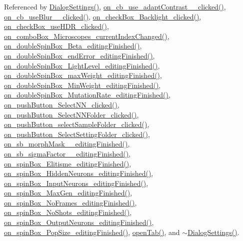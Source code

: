 Referenced by \hyperlink{dialogsettings_8cpp_source_l00005}{Dialog\+Settings()}, \hyperlink{dialogsettings_8cpp_source_l00370}{on\+\_\+cb\+\_\+use\+\_\+adapt\+Contrast\+\_\+\_\+clicked()}, \hyperlink{dialogsettings_8cpp_source_l00376}{on\+\_\+cb\+\_\+use\+Blur\+\_\+\_\+clicked()}, \hyperlink{dialogsettings_8cpp_source_l00222}{on\+\_\+check\+Box\+\_\+\+Backlight\+\_\+clicked()}, \hyperlink{dialogsettings_8cpp_source_l00256}{on\+\_\+check\+Box\+\_\+use\+H\+D\+R\+\_\+clicked()}, \hyperlink{dialogsettings_8cpp_source_l00227}{on\+\_\+combo\+Box\+\_\+\+Microscopes\+\_\+current\+Index\+Changed()}, \hyperlink{dialogsettings_8cpp_source_l00449}{on\+\_\+double\+Spin\+Box\+\_\+\+Beta\+\_\+editing\+Finished()}, \hyperlink{dialogsettings_8cpp_source_l00437}{on\+\_\+double\+Spin\+Box\+\_\+end\+Error\+\_\+editing\+Finished()}, \hyperlink{dialogsettings_8cpp_source_l00290}{on\+\_\+double\+Spin\+Box\+\_\+\+Light\+Level\+\_\+editing\+Finished()}, \hyperlink{dialogsettings_8cpp_source_l00441}{on\+\_\+double\+Spin\+Box\+\_\+max\+Weight\+\_\+editing\+Finished()}, \hyperlink{dialogsettings_8cpp_source_l00445}{on\+\_\+double\+Spin\+Box\+\_\+\+Min\+Weight\+\_\+editing\+Finished()}, \hyperlink{dialogsettings_8cpp_source_l00429}{on\+\_\+double\+Spin\+Box\+\_\+\+Mutation\+Rate\+\_\+editing\+Finished()}, \hyperlink{dialogsettings_8cpp_source_l00498}{on\+\_\+push\+Button\+\_\+\+Select\+N\+N\+\_\+clicked()}, \hyperlink{dialogsettings_8cpp_source_l00487}{on\+\_\+push\+Button\+\_\+\+Select\+N\+N\+Folder\+\_\+clicked()}, \hyperlink{dialogsettings_8cpp_source_l00465}{on\+\_\+push\+Button\+\_\+select\+Sample\+Folder\+\_\+clicked()}, \hyperlink{dialogsettings_8cpp_source_l00476}{on\+\_\+push\+Button\+\_\+\+Select\+Setting\+Folder\+\_\+clicked()}, \hyperlink{dialogsettings_8cpp_source_l00417}{on\+\_\+sb\+\_\+morph\+Mask\+\_\+\_\+editing\+Finished()}, \hyperlink{dialogsettings_8cpp_source_l00397}{on\+\_\+sb\+\_\+sigma\+Factor\+\_\+\_\+editing\+Finished()}, \hyperlink{dialogsettings_8cpp_source_l00433}{on\+\_\+spin\+Box\+\_\+\+Elitisme\+\_\+editing\+Finished()}, \hyperlink{dialogsettings_8cpp_source_l00457}{on\+\_\+spin\+Box\+\_\+\+Hidden\+Neurons\+\_\+editing\+Finished()}, \hyperlink{dialogsettings_8cpp_source_l00453}{on\+\_\+spin\+Box\+\_\+\+Input\+Neurons\+\_\+editing\+Finished()}, \hyperlink{dialogsettings_8cpp_source_l00421}{on\+\_\+spin\+Box\+\_\+\+Max\+Gen\+\_\+editing\+Finished()}, \hyperlink{dialogsettings_8cpp_source_l00286}{on\+\_\+spin\+Box\+\_\+\+No\+Frames\+\_\+editing\+Finished()}, \hyperlink{dialogsettings_8cpp_source_l00511}{on\+\_\+spin\+Box\+\_\+\+No\+Shots\+\_\+editing\+Finished()}, \hyperlink{dialogsettings_8cpp_source_l00461}{on\+\_\+spin\+Box\+\_\+\+Output\+Neurons\+\_\+editing\+Finished()}, \hyperlink{dialogsettings_8cpp_source_l00425}{on\+\_\+spin\+Box\+\_\+\+Pop\+Size\+\_\+editing\+Finished()}, \hyperlink{dialogsettings_8cpp_source_l00190}{open\+Tab()}, and \hyperlink{dialogsettings_8cpp_source_l00188}{$\sim$\+Dialog\+Settings()}.



